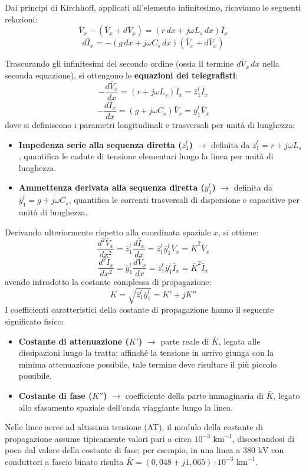 Dai principi di Kirchhoff, applicati all'elemento infinitesimo, ricaviamo le seguenti relazioni:
\[\bar{V}_x - (\bar{V}_x + d\bar{V}_x) = (r \, dx + j\omega L_s \, dx) \bar{I}_x\]
\[d\bar{I}_x = -(g \, dx + j\omega C_s \, dx) (\bar{V}_x + d\bar{V}_x)\]

Trascurando gli infinitesimi del secondo ordine (ossia il termine $d\bar{V}_x \, dx$ nella seconda equazione), si ottengono le \textbf{equazioni dei telegrafisti}:
\[-\frac{d\bar{V}_x}{dx} = (r + j\omega L_s) \bar{I}_x = \bar{z}_1^l \bar{I}_x\]
\[-\frac{d\bar{I}_x}{dx} = (g + j\omega C_s) \bar{V}_x = \bar{y}_1^l \bar{V}_x\]
dove si definiscono i parametri longitudinali e trasversali per unità di lunghezza:
\begin{itemize}
    \item \textbf{Impedenza serie alla sequenza diretta ($\bar{z}_1^l$)} $\rightarrow$ definita da $\bar{z}_1^l = r + j\omega L_s$, quantifica le cadute di tensione elementari lungo la linea per unità di lunghezza.
    \item \textbf{Ammettenza derivata alla sequenza diretta ($\bar{y}_1^l$)} $\rightarrow$ definita da $\bar{y}_1^l = g + j\omega C_s$, quantifica le correnti trasversali di dispersione e capacitive per unità di lunghezza.
\end{itemize}

Derivando ulteriormente rispetto alla coordinata spaziale $x$, si ottiene:
\[\frac{d^2\bar{V}_x}{dx^2} = \bar{z}_1^l \frac{d\bar{I}_x}{dx} = \bar{z}_1^l \bar{y}_1^l \bar{V}_x = \bar{K}^2 \bar{V}_x\]
\[\frac{d^2\bar{I}_x}{dx^2} = \bar{y}_1^l \frac{d\bar{V}_x}{dx} = \bar{z}_1^l \bar{y}_1^l \bar{I}_x = \bar{K}^2 \bar{I}_x\]
avendo introdotto la costante complessa di propagazione:
\[\bar{K} = \sqrt{\bar{z}_1^l \bar{y}_1^l} = K' + jK''\]
I coefficienti caratteristici della costante di propagazione hanno il seguente significato fisico:
\begin{itemize}
    \item \textbf{Costante di attenuazione ($K'$)} $\rightarrow$ parte reale di $\bar{K}$, legata alle dissipazioni lungo la tratta; affinché la tensione in arrivo giunga con la minima attenuazione possibile, tale termine deve risultare il più piccolo possibile.
    \item \textbf{Costante di fase ($K''$)} $\rightarrow$ coefficiente della parte immaginaria di $\bar{K}$, legato allo sfasamento spaziale dell'onda viaggiante lungo la linea.
\end{itemize}
Nelle linee aeree ad altissima tensione (AT), il modulo della costante di propagazione assume tipicamente valori pari a circa $10^{-3}\text{ km}^{-1}$, discostandosi di poco dal valore della costante di fase; per esempio, in una linea a $380\text{ kV}$ con conduttori a fascio binato risulta $\bar{K} = (0{,}048 + j1{,}065) \cdot 10^{-3}\text{ km}^{-1}$.


